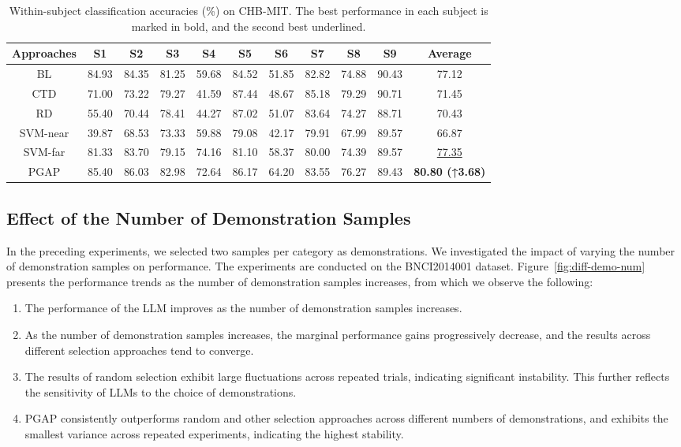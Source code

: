 \documentclass[journal,twocolumn]{IEEEtran}
\begin{document}
\begin{table}[htpb] \centering
  \caption{Within-subject classification accuracies (\%) on CHB-MIT. The best performance in each subject is marked in bold, and the second best underlined.}
  \label{tab:chb-mit-result}
  \begin{tabular}{c|c|c|c|c|c|c|c|c|c|c}
  \toprule
  Approaches & S1 & S2 & S3 & S4 & S5 & S6 & S7 & S8 & S9 & Average \\
  \midrule
  BL & 84.93 & 84.35 & 81.25 & 59.68 & 84.52 & 51.85 & 82.82 & 74.88 & 90.43 & 77.12 \\
  CTD & 71.00 & 73.22 & 79.27 & 41.59 & 87.44 & 48.67 & 85.18 & 79.29 & 90.71 & 71.45 \\
  RD & 55.40 & 70.44 & 78.41 & 44.27 & 87.02 & 51.07 & 83.64 & 74.27 & 88.71 & 70.43 \\
  SVM-near & 39.87 & 68.53 & 73.33 & 59.88 & 79.08 & 42.17 & 79.91 & 67.99 & 89.57 & 66.87 \\
  SVM-far & 81.33 & 83.70 & 79.15 & 74.16 & 81.10 & 58.37 & 80.00 & 74.39 & 89.57 & \underline{77.35} \\
  PGAP & 85.40 & 86.03 & 82.98 & 72.64 & 86.17 & 64.20 & 83.55 & 76.27 & 89.43 & \textbf{80.80 (↑3.68)} \\
  \bottomrule
  \end{tabular}
\end{table}

\subsection{Effect of the Number of Demonstration Samples}
In the preceding experiments, we selected two samples per category as demonstrations. We investigated the impact of varying the number of demonstration samples on performance. The experiments are conducted on the BNCI2014001 dataset. Figure~\ref{fig:diff-demo-num} presents the performance trends as the number of demonstration samples increases, from which we observe the following:

\begin{enumerate}
  \item The performance of the LLM improves as the number of demonstration samples increases.
  \item As the number of demonstration samples increases, the marginal performance gains progressively decrease, and the results across different selection approaches tend to converge.
  \item The results of random selection exhibit large fluctuations across repeated trials, indicating significant instability. This further reflects the sensitivity of LLMs to the choice of demonstrations.
  \item PGAP consistently outperforms random and other selection approaches across different numbers of demonstrations, and exhibits the smallest variance across repeated experiments, indicating the highest stability.
\end{enumerate}
\end{document}
